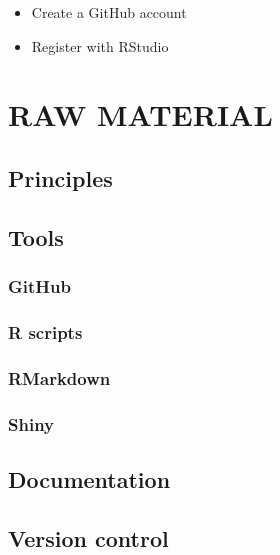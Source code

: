 \documentclass[
]{book}
\providecommand{\tightlist}{%
  \setlength{\itemsep}{0pt}\setlength{\parskip}{0pt}}
\begin{document}
\begin{itemize}
\tightlist
\item
  Create a GitHub account
\item
  Register with RStudio
\end{itemize}

\hypertarget{raw-material}{%
\section{RAW MATERIAL}\label{raw-material}}

\hypertarget{principles-1}{%
\subsection{Principles}\label{principles-1}}

\hypertarget{tools-1}{%
\subsection{Tools}\label{tools-1}}

\hypertarget{github-2}{%
\subsubsection{GitHub}\label{github-2}}

\hypertarget{r-scripts-1}{%
\subsubsection{R scripts}\label{r-scripts-1}}

\hypertarget{rmarkdown-1}{%
\subsubsection{RMarkdown}\label{rmarkdown-1}}

\hypertarget{shiny-1}{%
\subsubsection{Shiny}\label{shiny-1}}

\hypertarget{documentation-1}{%
\subsection{Documentation}\label{documentation-1}}

\hypertarget{version-control-1}{%
\subsection{Version control}\label{version-control-1}}
\end{document}
